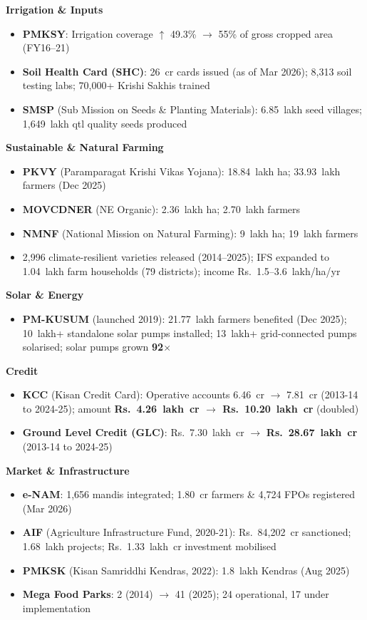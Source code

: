 \textbf{Irrigation \& Inputs}
\begin{itemize}
  \item \textbf{PMKSY}: Irrigation coverage $\uparrow$ 49.3\% $\to$ 55\% of gross cropped area (FY16--21)
  \item \textbf{Soil Health Card (SHC)}: 26~cr cards issued (as of Mar 2026); 8,313 soil testing labs; 70,000+ Krishi Sakhis trained
  \item \textbf{SMSP} (Sub Mission on Seeds \& Planting Materials): 6.85~lakh seed villages; 1,649~lakh qtl quality seeds produced
\end{itemize}

\textbf{Sustainable \& Natural Farming}
\begin{itemize}
  \item \textbf{PKVY} (Paramparagat Krishi Vikas Yojana): 18.84~lakh ha; 33.93~lakh farmers (Dec 2025)
  \item \textbf{MOVCDNER} (NE Organic): 2.36~lakh ha; 2.70~lakh farmers
  \item \textbf{NMNF} (National Mission on Natural Farming): 9~lakh ha; 19~lakh farmers
  \item 2,996 climate-resilient varieties released (2014--2025); IFS expanded to 1.04~lakh farm households (79 districts); income Rs.~1.5--3.6~lakh/ha/yr
\end{itemize}

\textbf{Solar \& Energy}
\begin{itemize}
  \item \textbf{PM-KUSUM} (launched 2019): 21.77~lakh farmers benefited (Dec 2025); 10~lakh+ standalone solar pumps installed; 13~lakh+ grid-connected pumps solarised; solar pumps grown \textbf{92$\times$}
\end{itemize}

\textbf{Credit}
\begin{itemize}
  \item \textbf{KCC} (Kisan Credit Card): Operative accounts 6.46~cr $\to$ 7.81~cr (2013-14 to 2024-25); amount \textbf{Rs.~4.26~lakh~cr $\to$ Rs.~10.20~lakh~cr} (doubled)
  \item \textbf{Ground Level Credit (GLC)}: Rs.~7.30~lakh~cr $\to$ \textbf{Rs.~28.67~lakh~cr} (2013-14 to 2024-25)
\end{itemize}

\textbf{Market \& Infrastructure}
\begin{itemize}
  \item \textbf{e-NAM}: 1,656 mandis integrated; 1.80~cr farmers \& 4,724 FPOs registered (Mar 2026)
  \item \textbf{AIF} (Agriculture Infrastructure Fund, 2020-21): Rs.~84,202~cr sanctioned; 1.68~lakh projects; Rs.~1.33~lakh~cr investment mobilised
  \item \textbf{PMKSK} (Kisan Samriddhi Kendras, 2022): 1.8~lakh Kendras (Aug 2025)
  \item \textbf{Mega Food Parks}: 2 (2014) $\to$ 41 (2025); 24 operational, 17 under implementation
\end{itemize}

